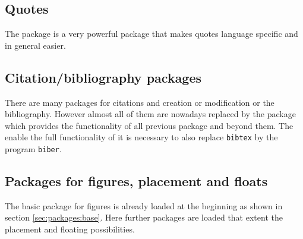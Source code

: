 
\subsection{Quotes}
\label{sec:packages:quotes}

The package  is a very powerful package that makes quotes language specific and in general easier.



\subsection{Citation/bibliography packages}
\label{sec:packages:bibliography}
There are many packages for citations and creation or modification or the bibliography. However almost all of them are nowadays replaced by the package 
 which provides the functionality of all previous package and beyond them. The enable the full functionality of  it is necessary to also replace \texttt{bibtex} by the program \texttt{biber}.



\subsection{Packages for figures, placement and floats}
\label{sec:packages:figures}

The basic package  for figures is already loaded at the beginning as shown in section \ref{sec:packages:base}. Here further packages are loaded that extent the placement and floating possibilities.

